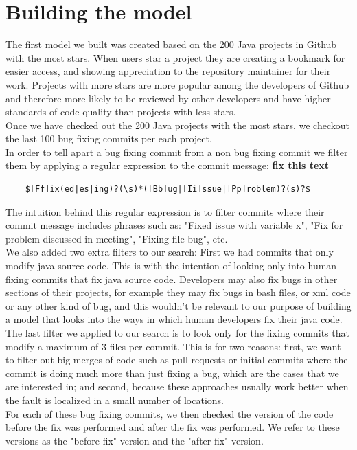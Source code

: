\documentclass[conference]{IEEEtran}
\newcommand{\todo}[1]
  {{\scriptsize \textbf{\color{red} {#1}}}}
\begin{document}
\section{Building the model}
The first model we built was created based on the 200 Java projects in Github with the most stars. When users star a project they are creating a bookmark for easier access, and showing appreciation to the repository maintainer for their work. Projects with more stars are more popular among the developers of Github and therefore more likely to be reviewed by other developers and have higher standards of code quality than projects with less stars.\\
Once we have checked out the 200 Java projects with the most stars, we checkout the last 100 bug fixing commits per each project. \\
In order to tell apart a bug fixing commit from a non bug fixing commit we filter them by applying a regular expression to the commit message:
\todo{fix this text}
\begin{verbatim}
    $[Ff]ix(ed|es|ing)?(\s)*([Bb]ug|[Ii]ssue|[Pp]roblem)?(s)?$
\end{verbatim}
The intuition behind this regular expression is to filter commits where their commit message includes phrases such as: "Fixed issue with variable x", "Fix for problem discussed in meeting", "Fixing file bug", etc.\\
We also added two extra filters to our search: First we had commits that only modify java source code. This is with the intention of looking only into human fixing commits that fix java source code. Developers may also fix bugs in other sections of their projects, for example they may fix bugs in bash files, or xml code or any other kind of bug, and this wouldn't be relevant to our purpose of building a model that looks into the ways in which human developers fix their java code.\\
The last filter we applied to our search is to look only for the fixing commits that modify a maximum of 3 files per commit. This is for two reasons: first, we want to filter out big merges of code such as pull requests or initial commits where the commit is doing much more than just fixing a bug, which are the cases that we are interested in; and second, because these approaches usually work better when the fault is localized in a small number of locations.\\
For each of these bug fixing commits, we then checked the version of the code before the fix was performed and after the fix was performed. We refer to these versions as the "before-fix" version and the "after-fix" version.\\
\end{document}
